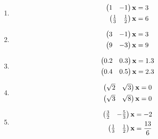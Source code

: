 \documentclass[journal,12pt,twocolumn]{IEEEtran}
\renewcommand\thesection{\arabic{section}}
\begin{document}
\begin{enumerate}[label=\thesection.\arabic*.,ref=\thesection.\theenumi]
\begin{enumerate}[itemsep=2pt]
%
%
\item
\begin{align}
\begin{split}
\begin{pmatrix}1 & -1 \end{pmatrix}\mathbf{x}&=3
\\
\begin{pmatrix}\frac{1}{3} & \frac{1}{2} \end{pmatrix}\mathbf{x}&=6
\end{split}
\label{linform/10/ab/1.0.2}
\end{align}
\item
\begin{align}
\begin{split}
\begin{pmatrix}3 & -1 \end{pmatrix}\mathbf{x}&=3
\\
\begin{pmatrix}9 & -3 \end{pmatrix}\mathbf{x}&=9
\end{split}
\label{linform/10/1.0.1}
\end{align}
\item
\begin{align}
\begin{split}
\begin{pmatrix}0.2 & 0.3 \end{pmatrix}\mathbf{x}&=1.3
\\
\begin{pmatrix}0.4 & 0.5 \end{pmatrix}\mathbf{x}&=2.3
\end{split}
\label{linform/10/1.0.2}
\end{align}
\item
\begin{align}
\begin{split}
\begin{pmatrix}\sqrt{2} & \sqrt{3} \end{pmatrix}\mathbf{x}&=0
\\
\begin{pmatrix}\sqrt{3} & \sqrt{8} \end{pmatrix}\mathbf{x}&=0
\end{split}
\end{align}
\item
\begin{align}
\begin{split}
\begin{pmatrix}\frac{3}{2} & -\frac{5}{3} \end{pmatrix}\mathbf{x}&=-2
\\
\begin{pmatrix}\frac{1}{3} & \frac{1}{2} \end{pmatrix}\mathbf{x}&=\frac{13}{6}
\end{split}
\end{align}
\end{enumerate}
%
\solution


\end{enumerate}
\end{document}
